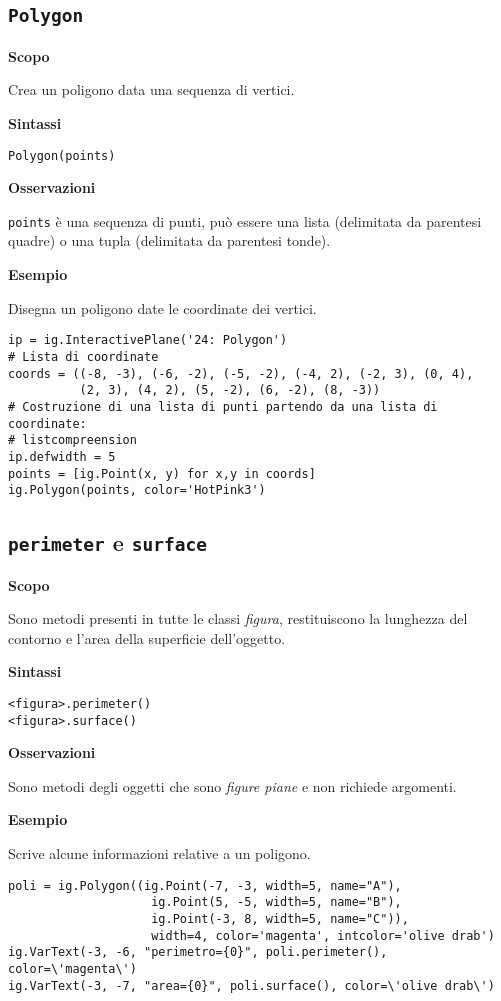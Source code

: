 \subsection{\texttt{Polygon}}
\label{sub:geoint_polygon}
\textbf{Scopo}

Crea un poligono data una sequenza di vertici.

\textbf{Sintassi}

\begin{lstlisting}
Polygon(points)
\end{lstlisting}

\textbf{Osservazioni}

\texttt{points} è una sequenza di punti, può essere una lista (delimitata da
parentesi quadre) o una tupla (delimitata da parentesi tonde).

\textbf{Esempio}

Disegna un poligono date le coordinate dei vertici.

\begin{lstlisting}
ip = ig.InteractivePlane('24: Polygon')
# Lista di coordinate
coords = ((-8, -3), (-6, -2), (-5, -2), (-4, 2), (-2, 3), (0, 4),
          (2, 3), (4, 2), (5, -2), (6, -2), (8, -3))
# Costruzione di una lista di punti partendo da una lista di coordinate:
# listcompreension
ip.defwidth = 5
points = [ig.Point(x, y) for x,y in coords]
ig.Polygon(points, color='HotPink3')
\end{lstlisting}


\subsection{\texttt{perimeter} e \texttt{surface}}
\label{sub:geoint_perimeter_e_surface}
\textbf{Scopo}

Sono metodi presenti in tutte le classi \emph{figura}, restituiscono
la lunghezza del contorno e l'area della superficie dell'oggetto.

\textbf{Sintassi}

\begin{lstlisting}
<figura>.perimeter()
<figura>.surface()
\end{lstlisting}

\textbf{Osservazioni}

Sono metodi degli oggetti che sono \emph{figure piane} e non richiede argomenti.

\textbf{Esempio}

Scrive alcune informazioni relative a un poligono.

\begin{lstlisting}
poli = ig.Polygon((ig.Point(-7, -3, width=5, name="A"),
                    ig.Point(5, -5, width=5, name="B"),
                    ig.Point(-3, 8, width=5, name="C")),
                    width=4, color='magenta', intcolor='olive drab')
ig.VarText(-3, -6, "perimetro={0}", poli.perimeter(), color=\'magenta\')
ig.VarText(-3, -7, "area={0}", poli.surface(), color=\'olive drab\')
\end{lstlisting}


